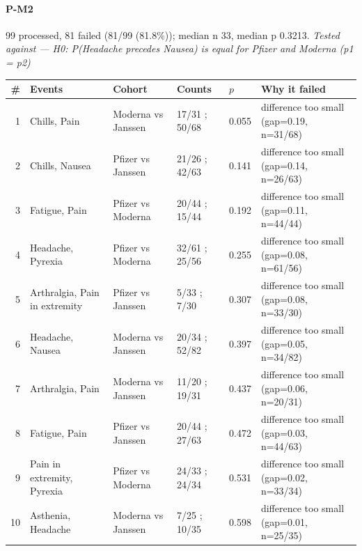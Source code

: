 \documentclass[11pt]{article}
\begin{document}
\paragraph{P-M2} 99 processed, 81 failed (81/99 (81.8\%)); median n 33, median p 0.3213. \emph{Tested against --- H0: P(Headache precedes Nausea) is equal for Pfizer and Moderna (p1 = p2)} \\
\begin{longtable}{@{}r p{3.9cm} p{2.5cm} l l p{4.4cm}@{}}
\toprule
\# & Events & Cohort & Counts & $p$ & Why it failed \\
\midrule \endhead
1 & Chills, Pain & Moderna vs Janssen & 17/31 ; 50/68 & 0.055 & difference too small (gap=0.19, n=31/68) \\
2 & Chills, Nausea & Pfizer vs Janssen & 21/26 ; 42/63 & 0.141 & difference too small (gap=0.14, n=26/63) \\
3 & Fatigue, Pain & Pfizer vs Moderna & 20/44 ; 15/44 & 0.192 & difference too small (gap=0.11, n=44/44) \\
4 & Headache, Pyrexia & Pfizer vs Moderna & 32/61 ; 25/56 & 0.255 & difference too small (gap=0.08, n=61/56) \\
5 & Arthralgia, Pain in extremity & Pfizer vs Janssen & 5/33 ; 7/30 & 0.307 & difference too small (gap=0.08, n=33/30) \\
6 & Headache, Nausea & Moderna vs Janssen & 20/34 ; 52/82 & 0.397 & difference too small (gap=0.05, n=34/82) \\
7 & Arthralgia, Pain & Moderna vs Janssen & 11/20 ; 19/31 & 0.437 & difference too small (gap=0.06, n=20/31) \\
8 & Fatigue, Pain & Pfizer vs Janssen & 20/44 ; 27/63 & 0.472 & difference too small (gap=0.03, n=44/63) \\
9 & Pain in extremity, Pyrexia & Pfizer vs Moderna & 24/33 ; 24/34 & 0.531 & difference too small (gap=0.02, n=33/34) \\
10 & Asthenia, Headache & Moderna vs Janssen & 7/25 ; 10/35 & 0.598 & difference too small (gap=0.01, n=25/35) \\
\bottomrule
\end{longtable}
\end{document}
